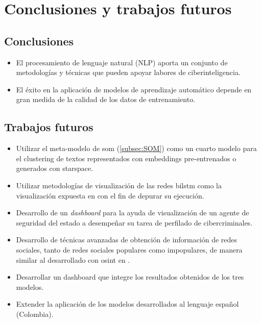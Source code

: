 \chapter{Conclusiones y trabajos futuros}

\label{chap:conclusions}

\section{Conclusiones}
\begin{itemize}
\item El procesamiento de lenguaje natural (NLP) aporta un conjunto de metodologías y técnicas que pueden apoyar labores de ciberinteligencia.

\item El éxito en la aplicación de modelos de aprendizaje automático depende en gran medida de la calidad de los datos de entrenamiento.
\end{itemize}

\section{Trabajos futuros}
\begin{itemize}
\item Utilizar el meta-modelo de \gls{som} (\cref{subsec:SOM}) como un cuarto modelo para el clustering de textos representados con embeddings pre-entrenados o generados con \gls{starspace}.
  
\item Utilizar metodologías de visualización de las redes \gls{bilstm} como la visualización expuesta en \cite{madsen2019visualizing} con el fin de depurar su ejecución.
  
\item Desarrollo de un \emph{dashboard} para la ayuda de visualización de un agente de seguridad del estado a desempeñar su tarea de perfilado de cibercriminales.
  
\item Desarrollo de técnicas avanzadas de obtención de información de redes sociales, tanto de redes sociales populares como impopulares, de manera similar al desarrollado con \gls{osint} en \cite{osint}.

\item Desarrollar un dashboard que integre los resultados obtenidos de los tres modelos.

\item Extender la aplicación de los modelos desarrollados al lenguaje español (Colombia).
\end{itemize}
